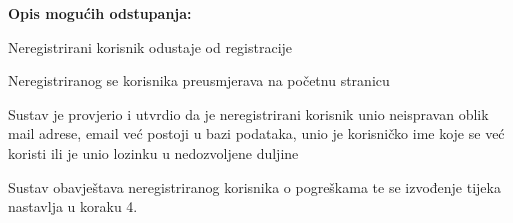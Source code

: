 \begin{packed_item}
\begin{packed_enum}
						\end{packed_enum}
						
						\item  \textbf{Opis mogućih odstupanja:}
						
						\item[] \begin{packed_item}

      					\item[6.a] Neregistrirani korisnik odustaje od registracije
							\item[] \begin{packed_enum}
								
								\item Neregistriranog se korisnika preusmjerava na početnu stranicu
								
							\end{packed_enum}
	
							\item[7.a] Sustav je provjerio i utvrdio da je neregistrirani korisnik unio neispravan oblik mail adrese, email već postoji u bazi podataka, unio je korisničko ime koje se već koristi ili je unio lozinku u nedozvoljene duljine
							\item[] \begin{packed_enum}
								
								\item Sustav obavještava neregistriranog korisnika o pogreškama te se izvođenje tijeka nastavlja u koraku 4.
								
							\end{packed_enum}

						\end{packed_item}
					\end{packed_item}
     
